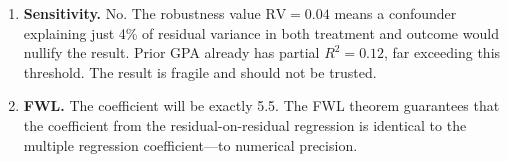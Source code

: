\documentclass[11pt,a4paper]{article}
\theoremstyle{definition}
\theoremstyle{plain}
\theoremstyle{remark}
\begin{document}
\begin{enumerate}
\item \textbf{Sensitivity.}
No. The robustness value $\text{RV} = 0.04$ means a confounder explaining just 4\% of residual variance in both treatment and outcome would nullify the result. Prior GPA already has partial $R^2 = 0.12$, far exceeding this threshold. The result is fragile and should not be trusted.

\item \textbf{FWL.}
The coefficient will be exactly 5.5. The FWL theorem guarantees that the coefficient from the residual-on-residual regression is identical to the multiple regression coefficient---to numerical precision.

\end{enumerate}
\end{document}
